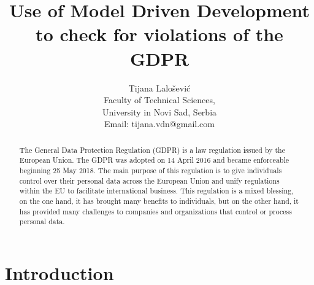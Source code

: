 \documentclass{article}
\begin{document}
\title{Use of Model Driven Development to check for violations of the GDPR}
\author{Tijana Lalošević \\ Faculty of Technical Sciences,\\ University in Novi Sad, Serbia\\
Email: tijana.vdn@gmail.com}

\date{}
\maketitle


\begin{abstract}
The General Data Protection Regulation (GDPR) is a law regulation issued by the European Union. The GDPR was adopted on 14 April 2016 and became enforceable beginning 25 May 2018. The main purpose of this regulation is to give individuals control over their personal data across the European Union and unify regulations within the EU to facilitate international business. This regulation is a mixed blessing, on the one hand, it has brought many benefits to individuals, but on the other hand, it has provided many challenges to companies and organizations that control or process personal data.
\end{abstract}


\section{Introduction}
\end{document}
